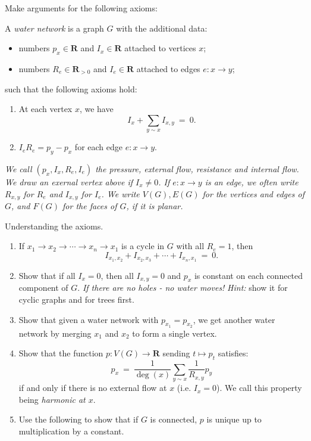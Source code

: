 \documentclass[11pt,fleqn]{book} %
\begin{document}
\begin{problem} 
    Make arguments for the following axioms:
   \begin{axiom}
    A \textit{water network} is a graph $G$ with the additional data: 
    \begin{itemize}
     \item  numbers $p_x\in \mathbf{R}$ and $I_x\in \mathbf{R}$ attached to vertices $x$;
     \item  numbers $R_{e}\in \mathbf{R}_{>0}$ and $I_{e}\in \mathbf{R}$ attached to edges $e:x\to y$;
    \end{itemize}
    such that the following axioms hold:
    \begin{enumerate}[label =\alph*.]
        \item At each vertex $x$, we have 
        $$I_x + \sum_{y\sim x}I_{x,y} \ = \ 0.$$
        \item $I_e R_e= p_y - p_x$ for each edge $e:x\to y$.
    \end{enumerate}
   \end{axiom}

\end{problem}


\textit{We call $(p_x,I_x,R_{e},I_{e})$ the \textit{pressure, external flow, resistance and internal flow}. We draw an exernal vertex above if $I_x \ne 0$. If $e:x\to y$ is an edge, we often write $R_{x,y}$ for $R_e$ and $I_{x,y}$ for $I_e$. We write $V(G),E(G)$ for the vertices and edges of $G$, and $F(G)$ for the faces of $G$, if it is planar.}

\begin{problem}
  Understanding the axioms.
   \begin{enumerate}[label =\alph*.]
    \item If $x_1 \to x_2 \to \cdots \to x_n \to x_1$ is a cycle in $G$ with all $R_e=1$, then 
        $$I_{x_1,x_2}+ I_{x_2,x_3}+ \cdots + I_{x_n,x_1} \ = \ 0.$$
    \item Show that if all $I_x=0$, then all $I_{x,y}=0$ and $p_x$ is constant on each connected component of $G$. \textit{If there are no holes - no water moves!} \textit{Hint:} show it for cyclic graphs and for trees first.

    \item Show that given a water network with $p_{x_1}=p_{x_2}$, we get another water network by merging $x_1$ and $x_2$ to form a single vertex.
    \item Show that the function $p:V(G) \to \mathbf{R}$ sending $t\mapsto p_t$ satisfies:
    $$p_x \ = \ \frac{1}{\deg(x)}\sum_{y\sim x}\frac{1}{R_{x,y}}p_y$$
    if and only if there is no external flow at $x$ (i.e. $I_x=0$). We call this property being \textit{harmonic at $x$}.
    \item Use the following to show that if $G$ is connected, $p$ is unique up to multiplication by a constant.
   \end{enumerate} 
\end{problem}
\end{document}
